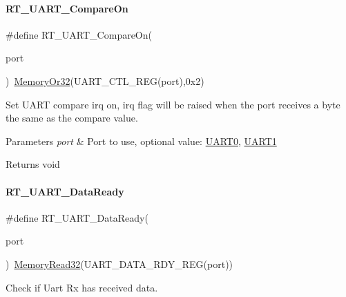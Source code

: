 \paragraph{\texorpdfstring{R\+T\+\_\+\+U\+A\+R\+T\+\_\+\+Compare\+On}{RT\_UART\_CompareOn}}
{\footnotesize\ttfamily \#define R\+T\+\_\+\+U\+A\+R\+T\+\_\+\+Compare\+On(\begin{DoxyParamCaption}\item[{}]{port }\end{DoxyParamCaption})~\mbox{\hyperlink{a00020_a27874a97deab7cecdde5ddecf466e31e}{Memory\+Or32}}(U\+A\+R\+T\+\_\+\+C\+T\+L\+\_\+\+R\+EG(port),0x2)}



Set U\+A\+RT compare irq on, irq flag will be raised when the port receives a byte the same as the compare value. 


\begin{DoxyParams}{Parameters}
{\em port} & Port to use, optional value\+: \mbox{\hyperlink{a00056_a0508661f121639ffdee7de2353a0def2}{U\+A\+R\+T0}}, \mbox{\hyperlink{a00056_a8d69bf04d07af4fbbab5a8bd291f65ff}{U\+A\+R\+T1}} \\
\hline
\end{DoxyParams}
\begin{DoxyReturn}{Returns}
void 
\end{DoxyReturn}
\mbox{\label{a00056_abd2a573ae35e4f6381f9f9758a12806b}} 
\paragraph{\texorpdfstring{R\+T\+\_\+\+U\+A\+R\+T\+\_\+\+Data\+Ready}{RT\_UART\_DataReady}}
{\footnotesize\ttfamily \#define R\+T\+\_\+\+U\+A\+R\+T\+\_\+\+Data\+Ready(\begin{DoxyParamCaption}\item[{}]{port }\end{DoxyParamCaption})~\mbox{\hyperlink{a00020_a2d484dc15bdf30ee11ab3b05f31f0e16}{Memory\+Read32}}(U\+A\+R\+T\+\_\+\+D\+A\+T\+A\+\_\+\+R\+D\+Y\+\_\+\+R\+EG(port))}



Check if Uart Rx has received data. 


